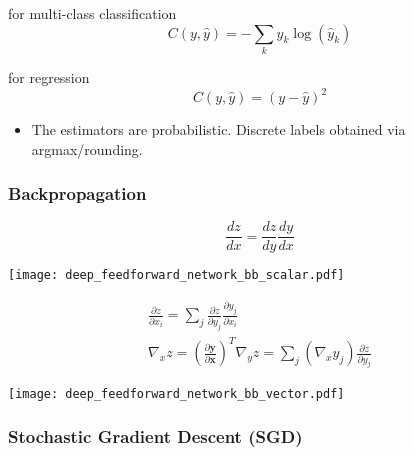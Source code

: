 \newpar{}
 for multi-class classification
\begin{equation*}
    C(y,\hat{y}) = - \sum_{k}y_k\log(\hat{y}_k)
\end{equation*}

\newpar{}
 for regression
\begin{equation*}
    C(y,\hat{y}) = {(y - \hat{y})}^2
\end{equation*}

\newpar{}
\begin{itemize}
    \item The estimators are probabilistic. Discrete labels obtained via argmax/rounding.
\end{itemize}

\subsubsection{Backpropagation}

\begin{equation*}
    \frac{dz}{dx} = \frac{dz}{dy}\frac{dy}{dx}
\end{equation*}

\begin{center}
    \texttt{[image: deep\_feedforward\_network\_bb\_scalar.pdf]}
\end{center}

\begin{gather*}
    \frac{\partial z}{\partial x_i} = \sum_{j}\frac{\partial z}{\partial y_j}\frac{\partial y_j}{\partial x_i} \\
    \nabla_x z = {\left(\frac{\partial \mathbf{y}}{\partial \mathbf{x}}\right)}^T \nabla_y z = \sum_{j}(\nabla_x y_j)\frac{\partial z}{\partial y_j}
\end{gather*}

\begin{center}
    \texttt{[image: deep\_feedforward\_network\_bb\_vector.pdf]}
\end{center}


\subsubsection{Stochastic Gradient Descent (SGD)}

